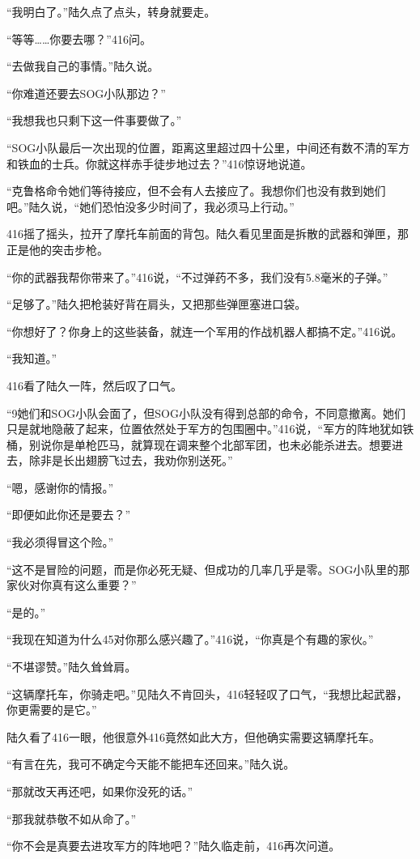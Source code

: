 “我明白了。”陆久点了点头，转身就要走。

“等等……你要去哪？”416问。

“去做我自己的事情。”陆久说。

“你难道还要去SOG小队那边？”

“我想我也只剩下这一件事要做了。”

“SOG小队最后一次出现的位置，距离这里超过四十公里，中间还有数不清的军方和铁血的士兵。你就这样赤手徒步地过去？”416惊讶地说道。

“克鲁格命令她们等待接应，但不会有人去接应了。我想你们也没有救到她们吧。”陆久说，“她们恐怕没多少时间了，我必须马上行动。”

416摇了摇头，拉开了摩托车前面的背包。陆久看见里面是拆散的武器和弹匣，那正是他的突击步枪。

“你的武器我帮你带来了。”416说，“不过弹药不多，我们没有5.8毫米的子弹。”

“足够了。”陆久把枪装好背在肩头，又把那些弹匣塞进口袋。

“你想好了？你身上的这些装备，就连一个军用的作战机器人都搞不定。”416说。

“我知道。”

416看了陆久一阵，然后叹了口气。

“9她们和SOG小队会面了，但SOG小队没有得到总部的命令，不同意撤离。她们只是就地隐蔽了起来，位置依然处于军方的包围圈中。”416说，“军方的阵地犹如铁桶，别说你是单枪匹马，就算现在调来整个北部军团，也未必能杀进去。想要进去，除非是长出翅膀飞过去，我劝你别送死。”

“嗯，感谢你的情报。”

“即便如此你还是要去？”

“我必须得冒这个险。”

“这不是冒险的问题，而是你必死无疑、但成功的几率几乎是零。SOG小队里的那家伙对你真有这么重要？”

“是的。”

“我现在知道为什么45对你那么感兴趣了。”416说，“你真是个有趣的家伙。”

“不堪谬赞。”陆久耸耸肩。

“这辆摩托车，你骑走吧。”见陆久不肯回头，416轻轻叹了口气，“我想比起武器，你更需要的是它。”

陆久看了416一眼，他很意外416竟然如此大方，但他确实需要这辆摩托车。

“有言在先，我可不确定今天能不能把车还回来。”陆久说。

“那就改天再还吧，如果你没死的话。”

“那我就恭敬不如从命了。”

“你不会是真要去进攻军方的阵地吧？”陆久临走前，416再次问道。

